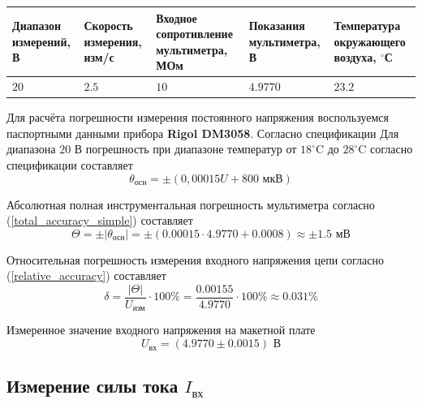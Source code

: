 \documentclass[12pt,a4paper]{article}
\begin{document}
\begin{center}
	\begin{tabularx}{\textwidth}{|>{\centering\arraybackslash}X|
								  >{\centering\arraybackslash}X|
								  >{\centering\arraybackslash}X|
								  >{\centering\arraybackslash}X|
								  >{\centering\arraybackslash}X|}
		\hline
		\small Диапазон измерений, В & 
		\small Скорость измерения, изм/с & 
		\small Входное сопротивление мультиметра, МОм & 
		\small Показания мультиметра, В & 
		\small Температура окружающего воздуха, $^\circ$С \\
		\hline
		$20$ & $2.5$ & $10$ & $4.9770$ & $23.2$ \\
		\hline
	\end{tabularx}
\end{center}

Для расчёта погрешности измерения постоянного напряжения воспользуемся паспортными 
данными прибора \textbf{Rigol DM3058}. Согласно спецификации Для диапазона $20$ В погрешность при диапазоне температур от $18^\circ\text{C}$ до $28^\circ\text{C}$ согласно 
спецификации составляет
\begin{equation}
\theta_{\text{осн}} = \pm(0,00015 U + 800 \text{ мкВ})
\label{accuracy_20_voltage}
\end{equation}

Абсолютная полная инструментальная погрешность мультиметра согласно (\ref{total_accuracy_simple}) составляет
\begin{equation*}
\Theta = \pm\left|\theta_{\text{осн}}\right| = \pm(0.00015 \cdot 4.9770 + 0.0008) \approx \pm 1.5 \text{ мВ}
\end{equation*}

Относительная погрешность измерения входного напряжения цепи согласно (\ref{relative_accuracy}) составляет
\begin{equation*}
\delta = \frac{\left|\Theta\right|}{U_{\text{изм}}} \cdot 100\% = \frac{0.00155}{4.9770} \cdot 100\% \approx 0.031\%
\end{equation*}

Измеренное значение входного напряжения на макетной плате
\begin{equation*}
U_{\text{вх}} = (4.9770 \pm 0.0015) \text{ В}
\end{equation*}

\subsection{Измерение силы тока $I_{\text{вх}}$}
\end{document}
